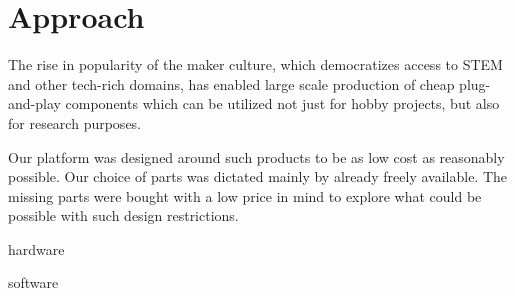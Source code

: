 \documentclass[class=report, crop=false]{standalone}
\begin{document}
\chapter{Approach}\label{cha:approach}
\pagestyle{scrheadings}
The rise in popularity of the maker culture, which democratizes access to STEM and other tech-rich domains, has enabled large scale production of cheap plug-and-play components which can be utilized not just for hobby projects, but also for research purposes.

Our platform was designed around such products to be as low cost as reasonably possible. Our choice of parts was dictated mainly by already freely available. The missing parts were bought with a low price in mind to explore what could be possible with such design restrictions.

{hardware}

{software}
\end{document}
